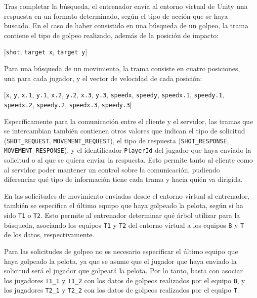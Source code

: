 Tras completar la búsqueda, el entrenador envía al entorno virtual de Unity una respuesta en un formato determinado, según el tipo de acción que se haya buscado. En el caso de haber consistido en una búsqueda de un golpeo, la trama contiene el tipo de golpeo realizado, además de la posición de impacto:
\begin{center}
    [\texttt{shot}, \texttt{target x}, \texttt{target y}]
\end{center}
Para una búsqueda de un movimiento, la trama consiste en cuatro posiciones, una para cada jugador, y el vector de velocidad de cada posición:
\begin{center}
    [\texttt{x}, \texttt{y}, \texttt{x.1}, \texttt{y.1}, \texttt{x.2}, \texttt{y.2}, \texttt{x.3}, \texttt{y.3}, \texttt{speedx}, \texttt{speedy}, \texttt{speedx.1}, \texttt{speedy.1}, \texttt{speedx.2}, \texttt{speedy.2}, \texttt{speedx.3}, \texttt{speedy.3}]
\end{center}

Específicamente para la comunicación entre el cliente y el servidor, las tramas que se intercambian también contienen otros valores que indican el tipo de solicitud (\texttt{SHOT\_REQUEST}, \texttt{MOVEMENT\_REQUEST}), el tipo de respuesta (\texttt{SHOT\_RESPONSE}, \texttt{MOVEMENT\_RESPONSE}), y el identificador \texttt{PlayerId} del jugador que haya enviado la solicitud o al que se quiera enviar la respuesta. Esto permite tanto al cliente como al servidor poder mantener un control sobre la comunicación, pudiendo diferenciar qué tipo de información tiene cada trama y hacia quién va dirigida. 

En las solicitudes de movimiento enviadas desde el entorno virtual al entrenador, también se especifica el último equipo que haya golpeado la pelota, según si ha sido \texttt{T1} o \texttt{T2}. Esto permite al entrenador determinar qué árbol utilizar para la búsqueda, asociando los equipos \texttt{T1} y \texttt{T2} del entorno virtual a los equipos \texttt{B} y \texttt{T} de los datos, respectivamente.

Para las solicitudes de golpeo no es necesario especificar el último equipo que haya golpeado la pelota, ya que se asume que el jugador que haya enviado la solicitud será el jugador que golpeará la pelota. Por lo tanto, basta con asociar los jugadores \texttt{T1\_1} y \texttt{T1\_2} con los datos de golpeos realizados por el equipo \texttt{B}, y los jugadores \texttt{T2\_1} y \texttt{T2\_2} con los datos de golpeos realizados por el equipo \texttt{T}.

